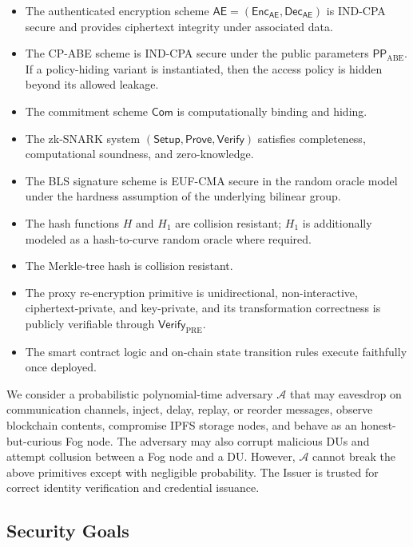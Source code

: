 \documentclass[conference]{IEEEtran}
\begin{document}
\begin{itemize}
    \item The authenticated encryption scheme $\textsf{AE}=(\textsf{Enc}_{\textsf{AE}},\textsf{Dec}_{\textsf{AE}})$ is IND-CPA secure and provides ciphertext integrity under associated data.
    \item The CP-ABE scheme is IND-CPA secure under the public parameters $\mathsf{PP}_{\mathrm{ABE}}$. If a policy-hiding variant is instantiated, then the access policy is hidden beyond its allowed leakage.
    \item The commitment scheme $\mathsf{Com}$ is computationally binding and hiding.
    \item The zk-SNARK system $(\textsf{Setup},\textsf{Prove},\textsf{Verify})$ satisfies completeness, computational soundness, and zero-knowledge.
    \item The BLS signature scheme is EUF-CMA secure in the random oracle model under the hardness assumption of the underlying bilinear group.
    \item The hash functions $H$ and $H_1$ are collision resistant; $H_1$ is additionally modeled as a hash-to-curve random oracle where required.
    \item The Merkle-tree hash is collision resistant.
    \item The proxy re-encryption primitive is unidirectional, non-interactive, ciphertext-private, and key-private, and its transformation correctness is publicly verifiable through $\textsf{Verify}_{\mathrm{PRE}}$.
    \item The smart contract logic and on-chain state transition rules execute faithfully once deployed.
\end{itemize}

We consider a probabilistic polynomial-time adversary $\mathcal{A}$ that may eavesdrop on communication channels, inject, delay, replay, or reorder messages, observe blockchain contents, compromise IPFS storage nodes, and behave as an honest-but-curious Fog node. The adversary may also corrupt malicious DUs and attempt collusion between a Fog node and a DU. However, $\mathcal{A}$ cannot break the above primitives except with negligible probability. The Issuer is trusted for correct identity verification and credential issuance.

\subsection{Security Goals}
\end{document}
